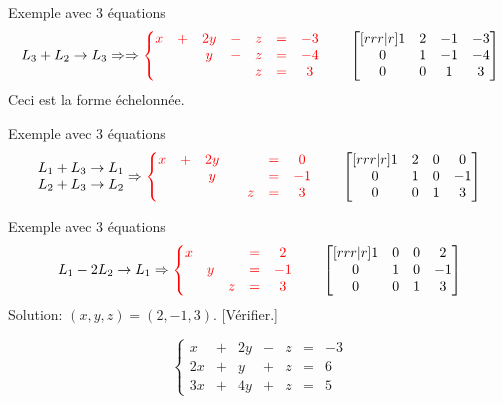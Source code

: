 \documentclass[french]{beamer}
\begin{document}
\begin{frame}{Exemple avec 3 équations}
\[
L_3 + L_2 \rightarrow L_3 \Rightarrow
 \Rightarrow
\color{red}
\left\{
	\begin{matrix}
	x &+& 2y &-& z &=& -3\\
	&& y &-& z &=& -4\\
	&&  && z &=& 3
	\end{matrix}\right.
	\qquad\color{black}
	\begin{bmatrix}[rrr|r]
1 & 2 & -1 & -3 \\
0 & 1 & -1 & -4 \\
0 & 0 & 1 & 3
\end{bmatrix}
\]
Ceci est la forme échelonnée.
\end{frame}

\begin{frame}{Exemple avec 3 équations}
\[
		\begin{matrix}
		L_1 + L_3 \rightarrow L_1\\
		L_2 + L_3 \rightarrow L_2\\
		\end{matrix}
 \Rightarrow
\color{red}
\left\{
	\begin{matrix}
		x &+& 2y && &=& 0\\
		 && y && &=& -1\\
		 &&  && z &=& 3
	\end{matrix}\right.
	\qquad\color{black}
	\begin{bmatrix}[rrr|r]
        1 & 2 & 0 & 0 \\
        0 & 1 & 0 & -1 \\
        0 & 0 & 1 & 3
\end{bmatrix}
\]
\end{frame}

\begin{frame}{Exemple avec 3 équations}
\[
	L_1 -2 L_2 \rightarrow L_1
 \Rightarrow
\color{red}
\left\{
	\begin{matrix}
	x & && =& 2\\
	 & y &&=& -1\\
	  && z &=& 3
	\end{matrix}\right.
	\qquad\color{black}
	\begin{bmatrix}[rrr|r]
        1 & 0 & 0 & 2 \\
        0 & 1 & 0 & -1 \\
        0 & 0 & 1 & 3
\end{bmatrix}
\]
Solution: $(x, y, z) = (2, -1, 3)$.  [Vérifier.]

\color{blue}
\[
	\left\{
	\begin{matrix}
	x &+& 2y &-& z &=& -3\\
	2x &+& y &+& z &=& 6\\
	3x &+& 4y &+& z &=& 5
	\end{matrix}\right.
	\]

\end{frame}
\end{document}
